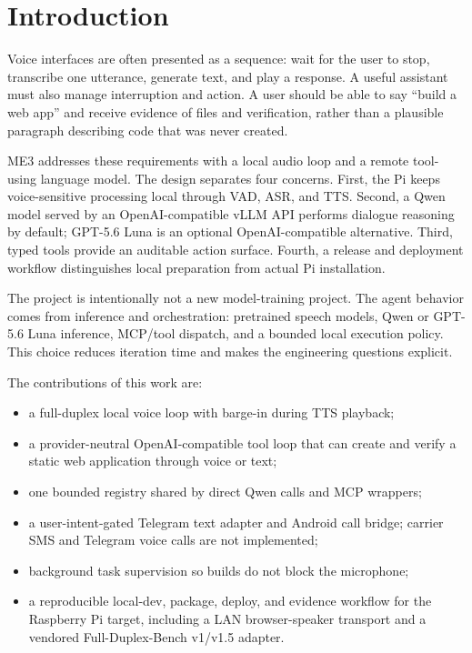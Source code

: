 \documentclass[sigconf,nonacm,balance=false]{acmart}
\begin{document}
\section{Introduction}

Voice interfaces are often presented as a sequence: wait for the user to stop,
transcribe one utterance, generate text, and play a response. A useful
assistant must also manage interruption and action. A user should be able to
say ``build a web app'' and receive evidence of files and verification, rather
than a plausible paragraph describing code that was never created.

ME3 addresses these requirements with a local audio loop and a remote tool-using
language model. The design separates four concerns. First, the Pi keeps
voice-sensitive processing local through VAD, ASR, and TTS. Second, a Qwen
model served by an OpenAI-compatible vLLM API performs dialogue reasoning by
default; GPT-5.6 Luna is an optional OpenAI-compatible alternative.
Third, typed tools provide an auditable action surface. Fourth, a release and
deployment workflow distinguishes local preparation from actual Pi installation.

The project is intentionally not a new model-training project. The agent
behavior comes from inference and orchestration: pretrained speech models,
Qwen or GPT-5.6 Luna inference, MCP/tool dispatch, and a bounded local execution policy. This
choice reduces iteration time and makes the engineering questions explicit.

The contributions of this work are:
\begin{itemize}[leftmargin=*]
\item a full-duplex local voice loop with barge-in during TTS playback;
\item a provider-neutral OpenAI-compatible tool loop that can create and verify
a static web application through voice or text;
\item one bounded registry shared by direct Qwen calls and MCP wrappers;
\item a user-intent-gated Telegram text adapter and Android call bridge;
carrier SMS and Telegram voice calls are not implemented;
\item background task supervision so builds do not block the microphone;
\item a reproducible local-dev, package, deploy, and evidence workflow for the
Raspberry Pi target, including a LAN browser-speaker transport and a vendored
Full-Duplex-Bench v1/v1.5 adapter.
\end{itemize}
\end{document}

